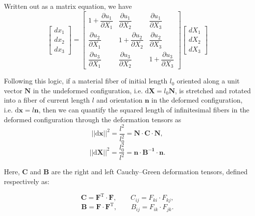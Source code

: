 \documentclass[a4paper,11pt]{article}
\begin{document}
Written out as a matrix equation, we have
\begin{equation}
\label{matdec}
\begin{bmatrix}
dx_1 \\
dx_2 \\
dx_3
\end{bmatrix}
=
\begin{bmatrix}
1 + \dfrac{\partial u_1}{\partial X_1} & \dfrac{\partial u_1}{\partial X_2} & \dfrac{\partial u_1}{\partial X_3} \\
\dfrac{\partial u_2}{\partial X_1} & 1 + \dfrac{\partial u_2}{\partial X_2} & \dfrac{\partial u_2}{\partial X_3} \\
\dfrac{\partial u_3}{\partial X_1} & \dfrac{\partial u_3}{\partial X_2} & 1 + \dfrac{\partial u_3}{\partial X_3}
\end{bmatrix}
\begin{bmatrix}
dX_1 \\
dX_2 \\
dX_3
\end{bmatrix}
\end{equation}

Following this logic, if a material fiber of initial length $l_0$ oriented along a unit vector $\mathbf{N}$ in the undeformed configuration, i.e. $\text{d}\mathbf{X}=l_0\mathbf{N}$, is stretched and rotated into a fiber of current length $l$ and orientation $\mathbf{n}$ in the deformed configuration, i.e. $\text{d}\mathbf{x}=l\mathbf{n}$, then we can quantify the squared length of infinitesimal fibers in the deformed configuration through the deformation tensors as  
\begin{equation}
||\text{d}\mathbf{x} ||^2 = \frac{l^2}{l_0^2} = \mathbf{N} \cdot \mathbf{C} \cdot \mathbf{N},
\end{equation}
\begin{equation}
||\text{d}\mathbf{X}||^2 = \frac{l_0^2}{l^2} = \mathbf{n} \cdot \mathbf{B^{-1}} \cdot \mathbf{n}.
\end{equation}

Here, $\mathbf{C}$ and $\mathbf{B}$ are the right and left Cauchy–Green deformation tensors, defined respectively as:

\begin{equation}
\mathbf{C} = \mathbf{F}^\mathrm{T}\cdot \mathbf{F}, \qquad C_{ij} = F_{ki}\cdot F_{kj},
\end{equation}
\begin{equation}
\mathbf{B} = \mathbf{F}\cdot  \mathbf{F}^\mathrm{T}, \qquad B_{ij} = F_{ik}\cdot F_{jk}.
\end{equation}
\end{document}
